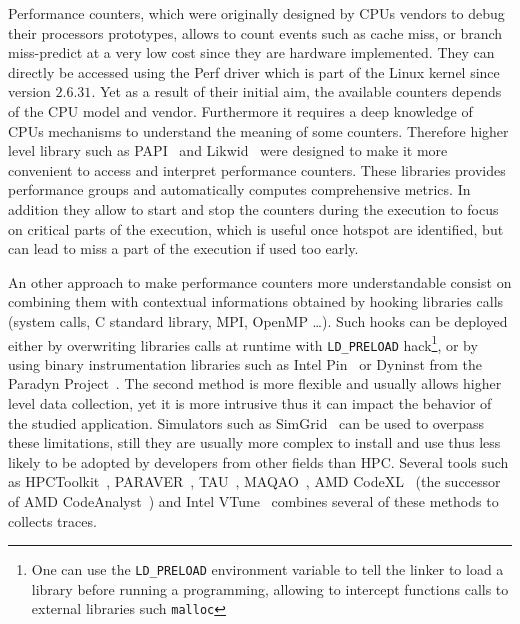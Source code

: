 Performance counters, which were originally designed by \glspl{CPU} vendors to
debug their processors prototypes, allows to count events such as cache miss,
or branch miss-predict at a very low cost since they are hardware implemented.
They can directly be accessed using the \gls{Perf} driver which is part of the
\gls{Linux} kernel since version $2.6.31$. Yet as a result of their initial
aim, the available counters depends of the \gls{CPU} model and vendor.
Furthermore it requires a deep knowledge of \glspl{CPU} mechanisms to
understand the meaning of some counters. Therefore higher level library such as
\gls{PAPI}~\cite{Browne00Portable,Malony11Parallel,Weaver13PAPI} and
\gls{Likwid}~\cite{Treibig10LIKWID} were designed to make it more convenient to access and
interpret performance counters. These libraries provides performance
groups and automatically computes comprehensive metrics. In addition they
allow to start and stop the counters during the execution to focus on critical
parts of the execution, which is useful once hotspot are identified, but can
lead to miss a part of the execution if used too early.

An other approach to make performance counters more understandable consist on
combining them with contextual informations obtained by hooking libraries calls
(system calls, C standard library, \gls{MPI}, \gls{OpenMP} \ldots). Such hooks
can be deployed either by overwriting libraries calls at runtime with
\texttt{LD\_PRELOAD} hack\footnote{One can use the \texttt{LD\_PRELOAD}
environment variable to tell the linker to load a library before running a
programming, allowing to intercept functions calls to external libraries such
\texttt{malloc}}, or by using binary instrumentation libraries such
as \gls{Intel} \gls{Pin}~\cite{Luk05Pin} or Dyninst from the Paradyn
Project~\cite{Miller95Paradyn}. The second method is more flexible and usually
allows higher level data collection, yet it is more intrusive thus it can
impact the behavior of the studied application. Simulators such as
\gls{SimGrid}~\cite{Casanova14Versatile} can be used to overpass these
limitations, still they are usually more complex to install and use thus less likely
to be adopted by developers from other fields than \gls{HPC}. Several tools
such as \gls{HPCToolkit}~\cite{Adhianto10HPCTOOLKIT},
\gls{PARAVER}~\cite{Pillet95PARAVER}, \gls{TAU}~\cite{Shende06Tau},
\gls{MAQAO}~\cite{Djoudi05MAQAO}, \gls{AMD}
\gls{CodeXL}~\cite{AMD16CodeXL} (the successor of \gls{AMD}
\gls{CodeAnalyst}~\cite{Drongowski08introduction}) and \gls{Intel}
\gls{VTune}~\cite{Reinders05VTune} combines several of these methods to
collects traces.

